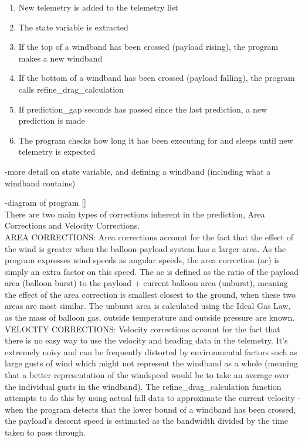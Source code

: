 \documentclass[11pt]{article}
\begin{document}
\begin{enumerate}
\item New telemetry is added to the telemetry list
\item The state variable is extracted
\item If the top of a windband has been crossed (payload rising), the program makes a new windband
\item If the bottom of a windband has been crossed (payload falling), the program calls refine\_drag\_calculation
\item If prediction\_gap seconds has passed since the last prediction, a new prediction is made
\item The program checks how long it has been executing for and sleeps until new telemetry is expected
\end{enumerate}

-more detail on state variable, and defining a windband (including what a windband contains)

-diagram of program [] \\

There are two main types of corrections inherent in the prediction, Area Corrections and Velocity Corrections.\\

AREA CORRECTIONS: Area corrections account for the fact that the effect of the wind is greater when the balloon-payload system has a larger area. As the program expresses wind speeds as angular speeds, the area correction (ac) is simply an extra factor on this speed. The ac is defined as the ratio of the payload area (balloon burst) to the payload + current balloon area (unburst), meaning the effect of the area correction is smallest closest to the ground, when these two areas are most similar. The unburst area is calculated using the Ideal Gas Law, as the mass of balloon gas, outside temperature and outside pressure are known. \\

VELOCITY CORRECTIONS: Velocity corrections account for the fact that there is no easy way to use the velocity and heading data in the telemetry. It's extremely noisy and can be frequently distorted by environmental factors such as large gusts of wind which might not represent the windband as a whole (meaning that a better representation of the windspeed would be to take an average over the individual gusts in the windband). The refine\_drag\_calculation function attempts to do this by using actual fall data to approximate the current velocity - when the program detects that the lower bound of a windband has been crossed, the payload's descent speed is estimated as the bandwidth divided by the time taken to pass through.\\
\end{document}
